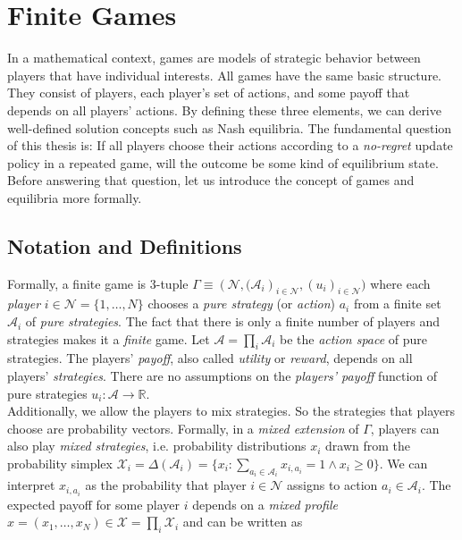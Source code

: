 
\chapter{Finite Games}\label{chapter:finiteGames}

In a mathematical context, games are models of strategic behavior between players that have individual interests. All games have the same basic structure. They consist of players, each player's set of actions, and some payoff that depends on all players' actions. By defining these three elements, we can derive well-defined solution concepts such as Nash equilibria. The fundamental question of this thesis is: If all players choose their actions according to a \textit{no-regret} update policy in a repeated game, will the outcome be some kind of equilibrium state. Before answering that question, let us introduce the concept of games and equilibria more formally.


\section{Notation and Definitions}\label{section:notationAndDefinitionsGames}

Formally, a finite game is $3$-tuple $\Gamma \equiv (\mathcal{N}, {(\mathcal{A}_i})_{i\in\mathcal{N}},{(u_i)}_{i\in\mathcal{N}})$ where each \textit{player} $i \in \mathcal{N} = \{1,\dots,N\}$ chooses a \textit{pure strategy} (or \textit{action}) $a_i$ from a finite set $\mathcal{A}_i$ of \textit{pure strategies}. The fact that there is only a finite number of players and strategies makes it a \textit{finite} game. Let $\mathcal{A} = \prod_{i}\mathcal{A}_i$ be the \textit{action space} of pure strategies. The players' \textit{payoff}, also called \textit{utility} or \textit{reward}, depends on all players' \textit{strategies}. There are no assumptions on the \textit{players' payoff} function of pure strategies $u_i: \mathcal{A} \to \mathbb{R}$. \\

Additionally, we allow the players to mix strategies. So the strategies that players choose are probability vectors. Formally, in a \textit{mixed extension} of $\Gamma$, players can also play \textit{mixed strategies}, i.e. probability distributions $x_i$ drawn from the probability simplex $\mathcal{X}_i = \Delta(\mathcal{A}_i)  = \{x_i: \sum_{a_i\in \mathcal{A}_i}x_{i,a_i} = 1 \land x_i \ge 0\}$. We can interpret $x_{i,a_i}$ as the probability that player $i \in \mathcal{N}$ assigns to action $a_i \in \mathcal{A}_i$. The expected payoff for some player $i$ depends on a \textit{mixed profile} $x = (x_1,\dots,x_N) \in \mathcal{X} = \prod_{i}\mathcal{X}_i$ and can be written as

